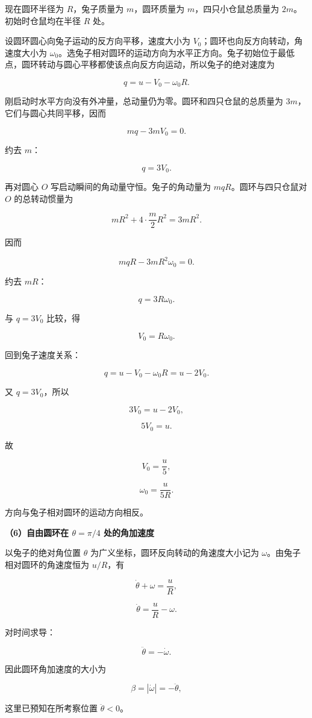 \documentclass[12pt,a4paper,UTF8]{ctexart}
\begin{document}
现在圆环半径为 \(R\)，兔子质量为 \(m\)，圆环质量为
\(m\)，四只小仓鼠总质量为 \(2m\)。初始时仓鼠均在半径 \(R\) 处。

设圆环圆心向兔子运动的反方向平移，速度大小为
\(V_0\)；圆环也向反方向转动，角速度大小为
\(\omega_0\)。选兔子相对圆环的运动方向为水平正方向。兔子初始位于最低点，圆环转动与圆心平移都使该点向反方向运动，所以兔子的绝对速度为

\[q=u-V_0-\omega_0R.\]

刚启动时水平方向没有外冲量，总动量仍为零。圆环和四只仓鼠的总质量为
\(3m\)，它们与圆心共同平移，因而

\[mq-3mV_0=0.\]

约去 \(m\)：

\[q=3V_0.\]

再对圆心 \(O\) 写启动瞬间的角动量守恒。兔子的角动量为
\(mqR\)。圆环与四只仓鼠对 \(O\) 的总转动惯量为

\[mR^2+4\cdot\frac m2R^2=3mR^2.\]

因而

\[mqR-3mR^2\omega_0=0.\]

约去 \(mR\)：

\[q=3R\omega_0.\]

与 \(q=3V_0\) 比较，得

\[V_0=R\omega_0.\]

回到兔子速度关系：

\[q=u-V_0-\omega_0R=u-2V_0.\]

又 \(q=3V_0\)，所以

\[3V_0=u-2V_0,\]

\[5V_0=u.\]

故

\[V_0=\frac u5,\]

\[\boxed{\omega_0=\frac{u}{5R}}.\]

方向与兔子相对圆环的运动方向相反。

\textbf{（6）自由圆环在 \(\theta=\pi/4\) 处的角加速度}

以兔子的绝对角位置 \(\theta\) 为广义坐标，圆环反向转动的角速度大小记为
\(\omega\)。由兔子相对圆环的角速度恒为 \(u/R\)，有

\[\dot\theta+\omega=\frac uR,\]

\[\dot\theta=\frac uR-\omega.\]

对时间求导：

\[\ddot\theta=-\dot\omega.\]

因此圆环角加速度的大小为

\[\beta=|\dot\omega|=-\ddot\theta,\]

这里已预知在所考察位置 \(\ddot\theta<0\)。
\end{document}
